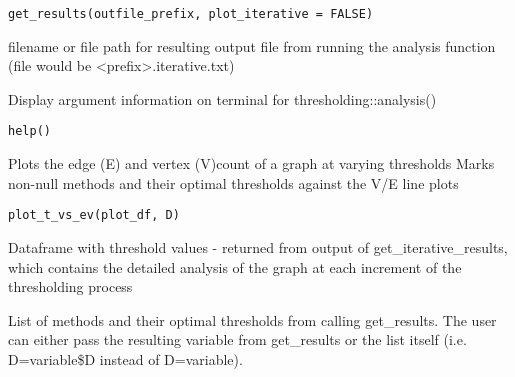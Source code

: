 \documentclass[a4paper]{book}
\begin{document}
%
\begin{Usage}
\begin{verbatim}
get_results(outfile_prefix, plot_iterative = FALSE)
\end{verbatim}
\end{Usage}
%
\begin{Arguments}
\begin{ldescription}
\item[\code{outfile\_prefix}] filename or file path for resulting output file from 
running the analysis function (file would be <prefix>.iterative.txt)
\end{ldescription}
\end{Arguments}
%
\begin{Description}
Display argument information on terminal for thresholding::analysis()
\end{Description}
%
\begin{Usage}
\begin{verbatim}
help()
\end{verbatim}
\end{Usage}
%
\begin{Description}
Plots the edge (E) and vertex (V)count of a graph at varying thresholds
Marks non-null methods and their optimal thresholds against the 
V/E line plots
\end{Description}
%
\begin{Usage}
\begin{verbatim}
plot_t_vs_ev(plot_df, D)
\end{verbatim}
\end{Usage}
%
\begin{Arguments}
\begin{ldescription}
\item[\code{plot\_df}] Dataframe with threshold values - returned from 
output of get\_iterative\_results, which contains the detailed
analysis of the graph at each increment of the thresholding
process

\item[\code{D}] List of methods and their optimal thresholds from 
calling get\_results. The user can either pass the resulting variable
from get\_results or the list itself (i.e. D=variable\$D instead of D=variable).
\end{ldescription}
\end{Arguments}
\end{document}
